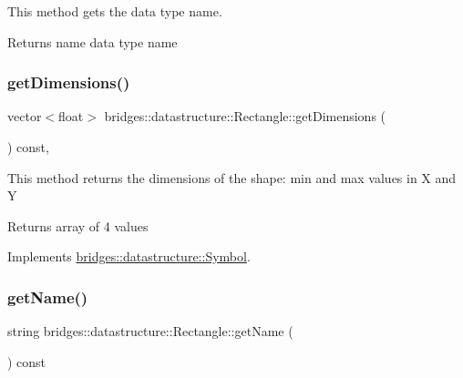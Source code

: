 This method gets the data type name. 

\begin{DoxyReturn}{Returns}
name data type name 
\end{DoxyReturn}
\mbox{\label{classbridges_1_1datastructure_1_1_rectangle_a60e75bd0d064c63a726134cd5ca0b827}} 
\subsubsection{\texorpdfstring{get\+Dimensions()}{getDimensions()}}
{\footnotesize\ttfamily vector$<$float$>$ bridges\+::datastructure\+::\+Rectangle\+::get\+Dimensions (\begin{DoxyParamCaption}{ }\end{DoxyParamCaption}) const\hspace{0.3cm}{\ttfamily [inline]}, {\ttfamily [virtual]}}

This method returns the dimensions of the shape\+: min and max values in X and Y

\begin{DoxyReturn}{Returns}
array of 4 values 
\end{DoxyReturn}


Implements \hyperlink{classbridges_1_1datastructure_1_1_symbol_a5c1cb50770c4f4a2ff9c8642afc0d665}{bridges\+::datastructure\+::\+Symbol}.

\mbox{\label{classbridges_1_1datastructure_1_1_rectangle_aee4fa283fa95e8c3b9f8efd5b19427b8}} 
\subsubsection{\texorpdfstring{get\+Name()}{getName()}}
{\footnotesize\ttfamily string bridges\+::datastructure\+::\+Rectangle\+::get\+Name (\begin{DoxyParamCaption}{ }\end{DoxyParamCaption}) const\hspace{0.3cm}{\ttfamily [inline]}}




